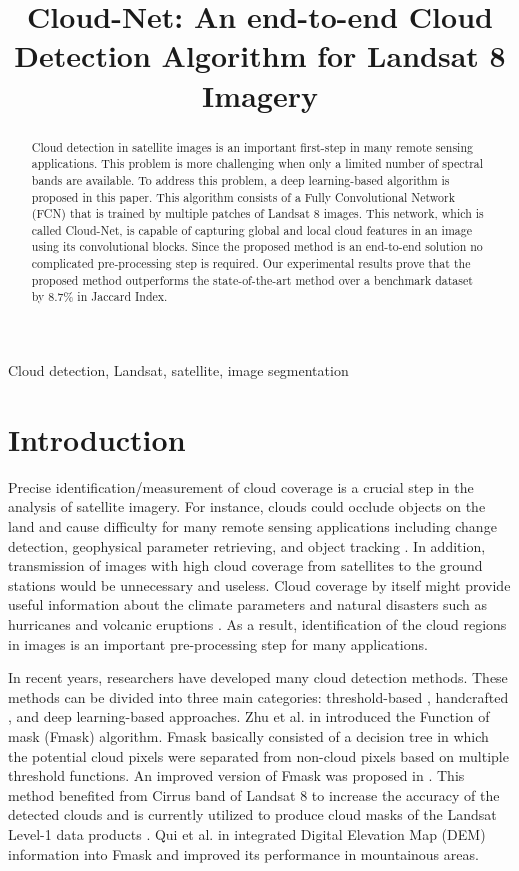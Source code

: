 \documentclass{article}
\title{Cloud-Net: An end-to-end Cloud Detection Algorithm for Landsat 8 Imagery}
\begin{document}
\maketitle
\begin{abstract}
Cloud detection in satellite images is an important first-step in many remote sensing applications. This problem is more challenging when only a limited number of spectral bands are available. To address this problem, a deep learning-based algorithm is proposed in this paper. This algorithm consists of a Fully Convolutional Network (FCN) that is trained by multiple patches of Landsat 8 images. This network, which is called Cloud-Net, is capable of capturing global and local cloud features in an image using its convolutional blocks. Since the proposed method is an end-to-end solution no complicated pre-processing step is required. Our experimental results prove that the proposed method outperforms the state-of-the-art method over a benchmark dataset by 8.7\% in Jaccard Index.
\end{abstract}
\begin{keywords}
Cloud detection, Landsat, satellite, image segmentation
\end{keywords}
\vspace{-5mm}
\section{Introduction}
\label{sec:intro}

Precise identification/measurement of cloud coverage is a crucial step in the analysis of satellite imagery. For instance, clouds could occlude objects on the land and cause difficulty for many remote sensing applications including change detection, geophysical parameter retrieving, and object tracking \cite{change_detect,geophys,hurricane2}. In addition, transmission of images with high cloud coverage from satellites to the ground stations would be unnecessary and useless. Cloud coverage by itself might provide useful information about the climate parameters and natural disasters such as hurricanes and volcanic eruptions \cite{volcano, hurricane}. As a result, identification of the cloud regions in images is an important pre-processing step for many applications.

In recent years, researchers have developed many cloud detection methods. These methods can be divided into three main categories: threshold-based \cite{acca,fmask1,fmask2,fmask3}, handcrafted \cite{hot,bag}, and deep learning-based \cite{multilevel, mymmsp} approaches. Zhu et al. in \cite{fmask1} introduced the Function of mask (Fmask) algorithm. Fmask basically consisted of a decision tree in which the potential cloud pixels were separated from non-cloud pixels based on multiple threshold functions. An improved version of Fmask was proposed in \cite{fmask2}. This method benefited from Cirrus band of Landsat 8 to increase the accuracy of the detected clouds and is currently utilized to produce cloud masks of the Landsat Level-1 data products \cite{web}. Qui et al. in \cite{fmask3} integrated Digital Elevation Map (DEM) information into Fmask and improved its performance in mountainous areas.
\end{document}
